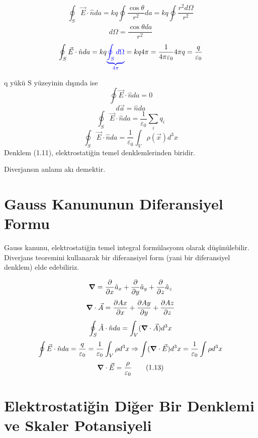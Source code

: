 \begin{theorem}
\begin{figure}[H]
\begin{tikzpicture}[x=0.75pt,y=0.75pt,yscale=-1,xscale=1]
\end{tikzpicture}
\end{figure}

\[ \oint_{S} \Vec{E} \cdot \hat{n} da = kq \oint \dfrac{\cos \theta}{r^{2}} da = kq \oint \dfrac{r^{2}d\Omega}{r^{2}} \]
\begin{align}
 d \Omega = \dfrac{\cos \theta da }{r^{2}}   
\end{align}
\[ \oint_{S} \Vec{E} \cdot \hat{n} da = kq  \begingroup \color{blue}{\underbrace{\oint_{S} d \Omega} _\text{$4\pi$} } \endgroup= kq 4\pi = \dfrac{1}{4 \pi \varepsilon_{0}} 4 \pi q = \dfrac{q}{\varepsilon_{0}}\]

q yükü S yüzeyinin dışında ise
\[ \oint \Vec{E} \cdot \hat{n} da =0\]
\[ d \Vec{a} = \hat{n} da\]
\[ \oint_{S} \Vec{E} \cdot \hat{n} da = \dfrac{1}{\varepsilon_{0}} \sum_{i} q_{i}  \tag{1.10} \]
\[ \oint_{S} \Vec{E} \cdot \hat{n} da = \dfrac{1}{\varepsilon_{0}} \int_{V} \rho(\Vec{x}) d^{3} x \tag{1.11} \]
Denklem (1.11), elektrostatiğin temel denklemlerinden biridir.

\begin{note}
 Diverjansın anlamı akı demektir.   
\end{note}
\end{theorem}

\section{Gauss Kanununun Diferansiyel Formu}

Gauss kanunu, elektrostatiğin temel integral formülasyonu olarak düşünülebilir. Diverjans teoremini kullanarak bir diferansiyel form (yani bir diferansiyel denklem) elde edebiliriz.

\begin{theorem}
\[ \grad = \dfrac{\partial}{\partial x} \hat{a}_{x} + \dfrac{\partial}{\partial y} \hat{a}_{y} + \dfrac{\partial}{\partial z} \hat{a}_{z}  \]  
\[ \grad \cdot \Vec{A} = \dfrac{\partial Ax}{\partial x}  + \dfrac{\partial Ay}{\partial y}  + \dfrac{\partial Az}{\partial z} \]  
\[ \oint_{S} \hat{A} \cdot \hat{n} da = \int_{V} ( \grad \cdot \Vec{A} ) d^{3} x\]
\[ \oint \Vec{E} \cdot \hat{n} da = \dfrac{q}{\varepsilon_{0}} = \dfrac{1}{\varepsilon_{0}} \int_{V} \rho d^{3}x \Rightarrow \int (\grad \cdot \Vec{E}) d^{3}x = \dfrac{1}{\varepsilon_{0}} \int \rho  d^{3} x  \]
\[ \grad \cdot \Vec{E} = \dfrac{\rho}{\varepsilon_{0}} \tag{1.13} \]
\end{theorem}

\section{Elektrostatiğin Diğer Bir Denklemi ve Skaler Potansiyeli}

